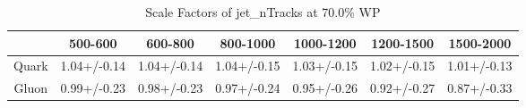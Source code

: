 \begin{table}
\centering
\caption{Scale Factors of jet_nTracks at 70.0\% WP}
\label{tab:jet_nTracks_0.7_Gluon}
\begin{tabular}{ccccccc}
\toprule
{} &      500-600 &      600-800 &     800-1000 &    1000-1200 &    1200-1500 &    1500-2000 \\
\midrule
Quark &  1.04+/-0.14 &  1.04+/-0.14 &  1.04+/-0.15 &  1.03+/-0.15 &  1.02+/-0.15 &  1.01+/-0.13 \\
Gluon &  0.99+/-0.23 &  0.98+/-0.23 &  0.97+/-0.24 &  0.95+/-0.26 &  0.92+/-0.27 &  0.87+/-0.33 \\
\bottomrule
\end{tabular}
\end{table}
